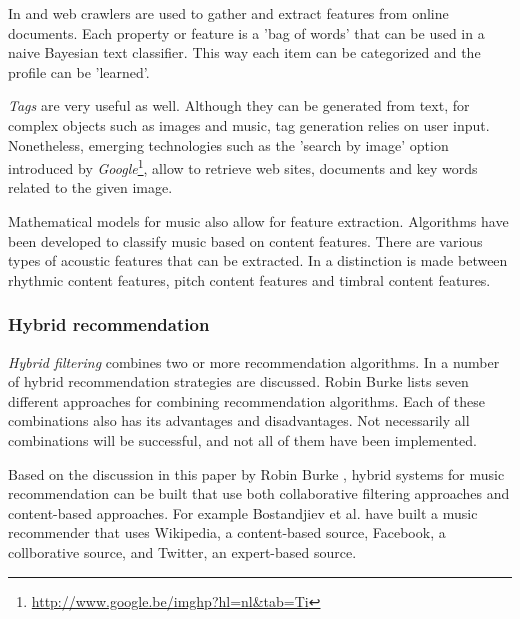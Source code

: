 In \cite{bostandjiev:2012} and \cite{melville:2002:CCF:777092.777124} web crawlers are used to gather and extract features from online documents. Each property or feature is a 'bag of words' that can be used in a naive Bayesian text classifier. This way each item can be categorized and the profile can be 'learned'\cite{melville:2002:CCF:777092.777124}.

\emph{Tags} are very useful as well. Although they can be generated from text, for complex objects such as images and music, tag generation relies on user input\cite{rajaraman:2012}. Nonetheless, emerging technologies such as the 'search by image' option introduced by \emph{Google}\footnote{\url{http://www.google.be/imghp?hl=nl&tab=Ti}}, allow to retrieve web sites, documents and key words related to the given image\cite{google:2011:afbeeldingen}.

Mathematical models for music also allow for feature extraction. Algorithms have been developed to classify music based on content features\cite{Li:2006:TIM:2219090.2219562, tzanetakis:2002}. There are various types of acoustic features that can be extracted. In \cite{Li:2006:TIM:2219090.2219562} a distinction is made between rhythmic content features, pitch content features and timbral content features.


\subsubsection{Hybrid recommendation}\label{chapter:literature_study:section:computer:subsection:algorithms:subsubsection:hf}

\emph{Hybrid filtering} combines two or more recommendation algorithms\cite{burke:2002}. In \cite{burke:2002} a number of hybrid recommendation strategies are discussed. Robin Burke lists seven different approaches for combining recommendation algorithms. Each of these combinations also has its advantages and disadvantages. Not necessarily all combinations will be successful, and not all of them have been implemented\cite{burke:2002}.

Based on the discussion in this paper by Robin Burke \cite{burke:2002}, hybrid systems for music recommendation can be built that use both collaborative filtering approaches and content-based approaches. For example Bostandjiev et al. \cite{bostandjiev:2012} have built a music recommender that uses Wikipedia, a content-based source, Facebook, a collborative source, and Twitter, an expert-based source.


